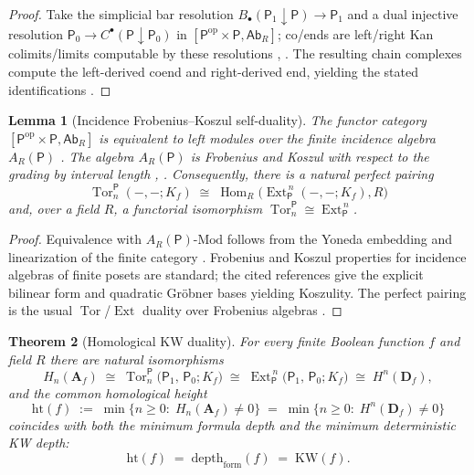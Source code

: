 \documentclass[12pt]{article}
\DeclareMathOperator{\Tor}{Tor}
\newcommand{\Ab}{\mathsf{Ab}}
\newcommand{\Hom}{\operatorname{Hom}}
\newcommand{\Ext}{\operatorname{Ext}}
\newcommand{\op}{\mathrm{op}}
\theoremstyle{plain}
\newtheorem{theorem}{Theorem}[section]
\newtheorem{lemma}[theorem]{Lemma}
\theoremstyle{definition}
\theoremstyle{remark}
\numberwithin{equation}{section}
\begin{document}
\begin{proof}
Take the simplicial bar resolution $B_\bullet(\mathsf P_1\!\downarrow\!\mathsf P)\to \mathsf P_1$ and a dual injective resolution $\mathsf P_0\to C^\bullet(\mathsf P\!\downarrow\!\mathsf P_0)$ in $[\mathsf P^{\op}\times \mathsf P,\Ab_R]$; co/ends are left/right Kan colimits/limits computable by these resolutions \cite{MacLane1998}, \cite{Kelly1982}. The resulting chain complexes compute the left-derived coend and right-derived end, yielding the stated identifications \cite{Weibel1994}.
\end{proof}

\begin{lemma}[Incidence Frobenius--Koszul self-duality]\label{lem:incidence-FK}
The functor category $[\mathsf P^{\op}\times \mathsf P,\Ab_R]$ is equivalent to left modules over the finite incidence algebra $A_R(\mathsf P)$ \cite{BjornerEkedahl2009}. The algebra $A_R(\mathsf P)$ is Frobenius and Koszul with respect to the grading by interval length \cite{Woodcock1998}, \cite{GreenReitenSolberg1996}. Consequently, there is a natural perfect pairing
\[
\Tor^{\mathsf P}_n(-,-;K_f)\;\cong\;\Hom_R\!\big(\Ext^{\,n}_{\mathsf P}(-,-;K_f),R\big)
\]
and, over a field $R$, a functorial isomorphism $\Tor^{\mathsf P}_n\cong \Ext^{\,n}_{\mathsf P}$.
\end{lemma}

\begin{proof}
Equivalence with $A_R(\mathsf P)\text{-}\mathrm{Mod}$ follows from the Yoneda embedding and linearization of the finite category \cite{LeinsterBasic}. Frobenius and Koszul properties for incidence algebras of finite posets are standard; the cited references give the explicit bilinear form and quadratic Gröbner bases yielding Koszulity. The perfect pairing is the usual $\Tor$/$\Ext$ duality over Frobenius algebras \cite{GreenReitenSolberg1996}.
\end{proof}

\begin{theorem}[Homological KW duality]\label{thm:HKW}
For every finite Boolean function $f$ and field $R$ there are natural isomorphisms
\[
H_n(\mathbf A_f)\;\cong\;\Tor^{\mathsf P}_n\!\big(\mathsf P_1,\,\mathsf P_0;K_f\big)\;\cong\;\Ext^{\,n}_{\mathsf P}\!\big(\mathsf P_1,\,\mathsf P_0;K_f\big)\;\cong\;H^n(\mathbf D_f),
\]
and the common homological height
\[
\mathrm{ht}(f)\;:=\;\min\{n\ge 0:\;H_n(\mathbf A_f)\neq 0\}\;=\;\min\{n\ge 0:\;H^n(\mathbf D_f)\neq 0\}
\]
coincides with both the minimum formula depth and the minimum deterministic KW depth:
\[
\mathrm{ht}(f)\;=\;\mathrm{depth}_{\mathrm{form}}(f)\;=\;\mathrm{KW}(f).
\]
\end{theorem}
\end{document}
